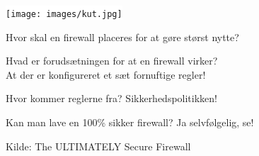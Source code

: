 \documentclass[Screen16to9,17pt,footrule]{foils}
\begin{document}

\begin{center}
\colorbox{white}{\texttt{[image: images/kut.jpg]}}
\end{center}

\begin{list2}
\item Hvor skal en firewall placeres for at gøre størst nytte?
\item Hvad er forudsætningen for at en firewall virker?\\
At der er konfigureret et sæt fornuftige regler!
\item Hvor kommer reglerne fra? Sikkerhedspolitikken!
\item Kan man lave en 100\% sikker firewall? Ja selvfølgelig, se!
\end{list2}


{\small Kilde:  The ULTIMATELY Secure Firewall}


\end{document}

